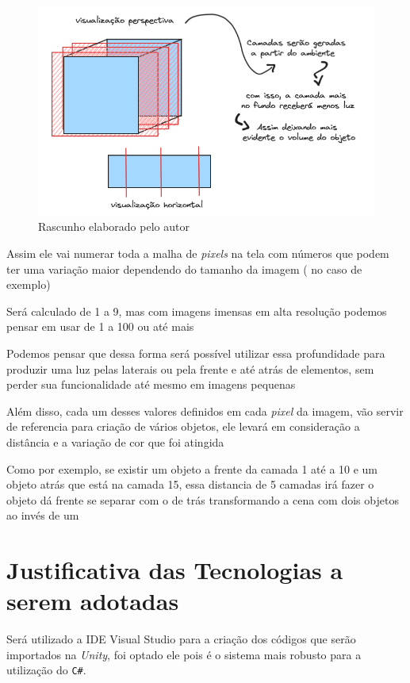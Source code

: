 \FloatBarrier
\begin{figure}[ht]
    \caption{Rascunho elaborado pelo autor}
    \centering
    \includegraphics[scale=0.5]{imagens/Sketch.png}

    \label{fig:sketch}
\end{figure}
\FloatBarrier

Assim ele vai numerar toda a malha de \textit{pixels} na tela com números que podem ter uma variação maior dependendo do tamanho da imagem ( no caso de exemplo)

Será calculado de 1 a 9, mas com imagens imensas em alta resolução podemos pensar em usar de 1 a 100 ou até mais

Podemos pensar que dessa forma será possível utilizar essa profundidade para produzir uma luz pelas laterais ou pela frente e até atrás de elementos, sem perder sua funcionalidade até mesmo em imagens pequenas

Além disso, cada um desses valores definidos em cada \textit{pixel} da imagem, vão servir de referencia para criação de vários objetos, ele levará em consideração a distância e a variação de cor que foi atingida

Como por exemplo, se existir um objeto a frente da camada 1 até a 10 e um objeto atrás que está na camada 15, essa distancia de 5 camadas irá fazer o objeto dá frente se separar com o de trás transformando a cena com dois objetos ao invés de um


\section{Justificativa das Tecnologias a serem adotadas}

Será utilizado a IDE Visual Studio para a criação dos códigos que serão importados na \textit{Unity}, foi optado ele pois é o sistema mais robusto para a utilização do \texttt{C\#}.

